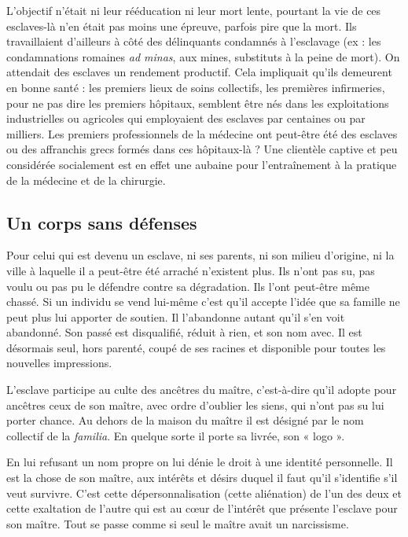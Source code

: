 L'objectif n'était ni leur rééducation ni leur mort lente, pourtant la
vie de ces esclaves-là n'en était pas moins une épreuve, parfois pire que la
mort. Ils travaillaient d'ailleurs à côté des délinquants condamnés à l'esclavage
(ex : les condamnations romaines \emph{ad minas}, aux mines, substituts
à la peine de mort). On attendait des esclaves un rendement productif.
Cela impliquait qu'ils demeurent en bonne santé : les premiers lieux de
soins collectifs, les premières infirmeries, pour ne pas dire les premiers
hôpitaux, semblent être nés dans les exploitations industrielles ou agricoles
qui employaient des esclaves par centaines ou par milliers. Les premiers
professionnels de la médecine ont peut-être été des esclaves ou des
affranchis grecs formés dans ces hôpitaux-là ? Une clientèle captive et
peu considérée socialement est en effet une aubaine pour l'entraînement
à la pratique de la médecine et de la chirurgie.

\subsection{Un corps sans défenses}

Pour celui qui est devenu un esclave, ni ses parents, ni son milieu
d'origine, ni la ville à laquelle il a peut-être été arraché n'existent plus. Ils
n'ont pas su, pas voulu ou pas pu le défendre contre sa dégradation. Ils
l'ont peut-être même chassé. Si un individu se vend lui-même c'est qu'il
accepte l'idée que sa famille ne peut plus lui apporter de soutien. Il
l'abandonne autant qu'il s'en voit abandonné. Son passé est disqualifié,
réduit à rien, et son nom avec. Il est désormais seul, hors parenté, coupé
de ses racines et disponible pour toutes les nouvelles impressions.

L'esclave participe au culte des ancêtres du maître, c'est-à-dire qu'il
adopte pour ancêtres ceux de son maître, avec ordre d'oublier les siens,
qui n'ont pas su lui porter chance. Au dehors de la maison du maître il
est désigné par le nom collectif de la \emph{familia}. En quelque sorte il porte sa
livrée, son « logo ».

En lui refusant un nom propre on lui dénie le droit à une identité
personnelle. Il est la chose de son maître, aux intérêts et désirs duquel il
faut qu'il s'identifie s'il veut survivre. C'est cette dépersonnalisation (cette
aliénation) de l'un des deux et cette exaltation de l'autre qui est au cœur
de l'intérêt que présente l'esclave pour son maître. Tout se passe comme
si seul le maître avait un narcissisme.

